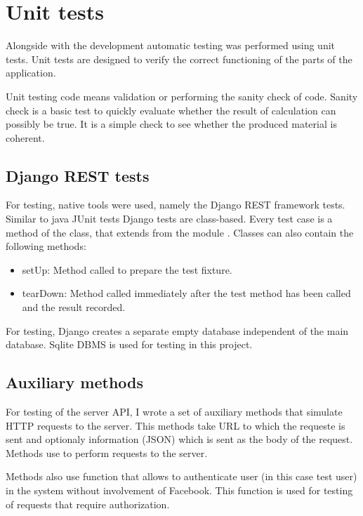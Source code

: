 \section{Unit tests}
Alongside with the development automatic testing was performed using unit tests. Unit tests are designed to verify the
correct functioning of the parts of the application.

Unit testing code means validation or performing the sanity check of code. Sanity check is a basic test to quickly
evaluate whether the result of calculation can possibly be true. It is a simple check to see whether the produced
material is coherent. \cite{unittesting}

\subsection{Django REST tests}
For testing, native tools were used, namely the Django REST framework tests. Similar to java JUnit tests Django tests
are class-based. Every test case is a method of the class, that extends  from the module
. Classes can also contain the following methods:

\begin{itemize}
\item{setUp}: Method called to prepare the test fixture.
\item{tearDown}: Method called immediately after the test method has been called and the result recorded.
\end{itemize}

For testing, Django creates a separate empty database independent of the main database. Sqlite DBMS is used for testing
in this project.

\subsection{Auxiliary methods}
For testing of the server API, I wrote a set of auxiliary methods that simulate HTTP requests to the server. This
methods take URL to which the requeste is sent and optionaly information (JSON) which is sent as the body of the
request. Methods use  to perform requests to the server.

Methods also use  function that allows to authenticate user (in this case test user) in the
system without involvement of Facebook. This function is used for testing of requests that require authorization.


